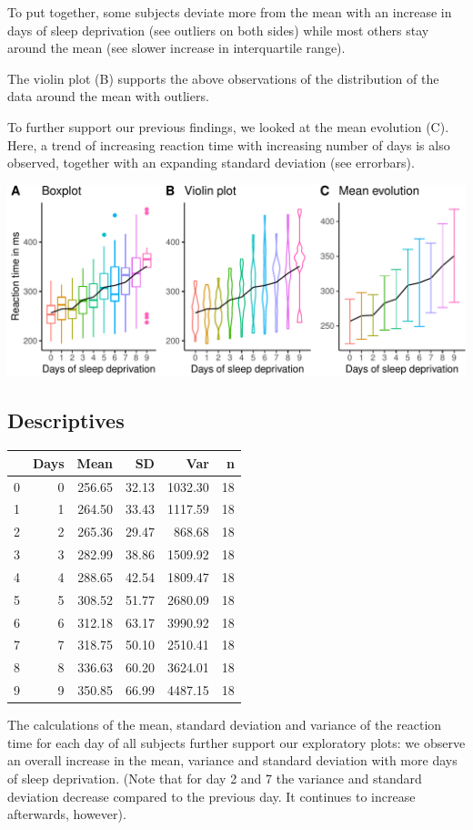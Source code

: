 \documentclass[
]{article}
\begin{document}
To put together, some subjects deviate more from the mean with an
increase in days of sleep deprivation (see outliers on both sides) while
most others stay around the mean (see slower increase in interquartile
range).

The violin plot (B) supports the above observations of the distribution
of the data around the mean with outliers.

To further support our previous findings, we looked at the mean
evolution (C). Here, a trend of increasing reaction time with increasing
number of days is also observed, together with an expanding standard
deviation (see errorbars).

\begin{center}\includegraphics{common_sleep_files/figure-latex/boxplot-1} \end{center}

\hypertarget{descriptives}{%
\subsection{Descriptives}\label{descriptives}}

\begin{longtable}[]{@{}lrrrrr@{}}
\toprule
& Days & Mean & SD & Var & n\tabularnewline
\midrule
\endhead
0 & 0 & 256.65 & 32.13 & 1032.30 & 18\tabularnewline
1 & 1 & 264.50 & 33.43 & 1117.59 & 18\tabularnewline
2 & 2 & 265.36 & 29.47 & 868.68 & 18\tabularnewline
3 & 3 & 282.99 & 38.86 & 1509.92 & 18\tabularnewline
4 & 4 & 288.65 & 42.54 & 1809.47 & 18\tabularnewline
5 & 5 & 308.52 & 51.77 & 2680.09 & 18\tabularnewline
6 & 6 & 312.18 & 63.17 & 3990.92 & 18\tabularnewline
7 & 7 & 318.75 & 50.10 & 2510.41 & 18\tabularnewline
8 & 8 & 336.63 & 60.20 & 3624.01 & 18\tabularnewline
9 & 9 & 350.85 & 66.99 & 4487.15 & 18\tabularnewline
\bottomrule
\end{longtable}

The calculations of the mean, standard deviation and variance of the
reaction time for each day of all subjects further support our
exploratory plots: we observe an overall increase in the mean, variance
and standard deviation with more days of sleep deprivation. (Note that
for day 2 and 7 the variance and standard deviation decrease compared to
the previous day. It continues to increase afterwards, however).
\end{document}
